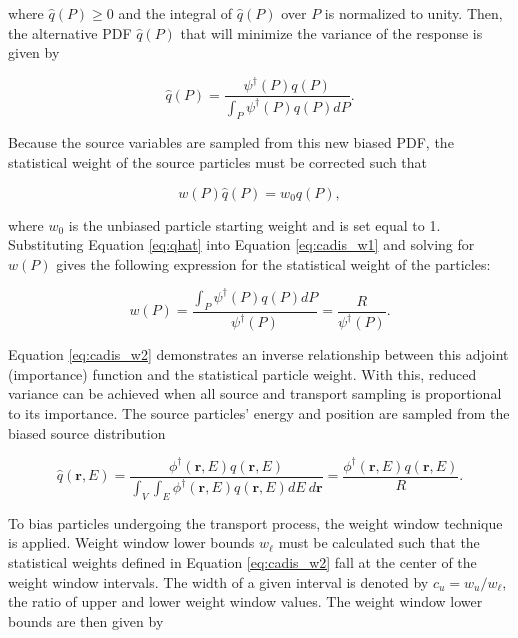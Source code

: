 \documentclass{article} %
\newcommand{\vecr}{\textbf{r}}
\newcommand{\qhat}{\ensuremath{\hat{q}}}
\begin{document}
\noindent where $\qhat(P) \geq 0$ and the integral of $\qhat(P)$ over $P$ is 
normalized to unity. Then, the alternative PDF $\qhat(P)$ that will minimize
the variance of the response is given by

\begin{equation}
\qhat(P) = \frac{\psi^{\dagger}(P)q(P)}{\int_P\psi^{\dagger}(P)q(P)dP}.
\label{eq:qhat}
\end{equation}

Because the source variables are sampled from this new biased PDF, the
statistical weight of the source particles must be corrected such that

\begin{equation}
w(P)\qhat(P) = w_0q(P),
\label{eq:cadis_w1}
\end{equation}

\noindent where $w_0$ is the unbiased particle starting weight and is set equal
to 1. Substituting Equation \ref{eq:qhat} into Equation \ref{eq:cadis_w1} and
solving for $w(P)$ gives the following expression for the statistical weight of
the particles:

\begin{equation}
w(P) = \frac{\int_P\psi^{\dagger}(P)q(P)dP}{\psi^{\dagger}(P)}
= \frac{R}{\psi^{\dagger}(P)}.
\label{eq:cadis_w2}
\end{equation}

\noindent Equation \ref{eq:cadis_w2} demonstrates an inverse relationship
between this adjoint (importance) function and the statistical particle weight.
With this, reduced variance can be achieved when all source and transport
sampling is proportional to its importance. The source particles' energy and
position are sampled from the biased source distribution

\begin{equation}
\qhat(\vecr,E) = 
\frac{\phi^{\dagger}(\vecr,E)q(\vecr,E)}
{\int_V\int_E\phi^{\dagger}(\vecr,E)q(\vecr,E) dE\ d\vecr} 
= \frac{\phi^{\dagger}(\vecr,E)q(\vecr,E)}{R}.
\label{eq:cadis_sb}
\end{equation}

To bias particles undergoing the transport process, the weight window technique
is applied. Weight window lower bounds $w_{\ell}$ must be calculated such that
the statistical weights defined in Equation \ref{eq:cadis_w2} fall at the
center of the weight window intervals. The width of a given interval is denoted
by $c_u = w_u/w_{\ell}$, the ratio of upper and lower weight window values. The
weight window lower bounds are then given by
\end{document}
